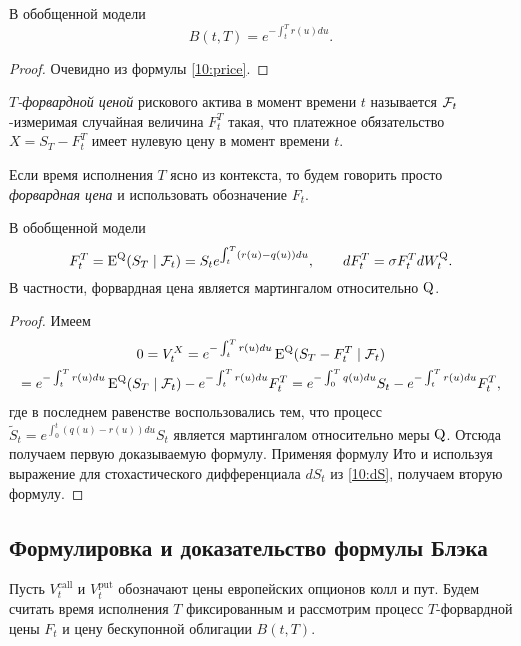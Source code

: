 \begin{proposition}
В обобщенной модели \bs
\[
B(t,T) = e^{-\int_t^T r(u) du}.
\]
\end{proposition}

\begin{proof}
Очевидно из формулы \eqref{10:price}.
\end{proof}

\begin{definition}
\emph{$T$-форвардной ценой} рискового актива в момент времени $t$ называется $\mathcal{F}_t$-измеримая случайная величина $F_t^T$ такая, что платежное обязательство $X=S_T - F_t^T$ имеет нулевую цену в момент времени $t$.

Если время исполнения $T$ ясно из контекста, то будем говорить просто \emph{форвардная цена} и использовать обозначение $F_t$.
\end{definition}

\begin{proposition}
В обобщенной модели \bs
\[
F_t^T = \operatorname{E}^{\mathrm{Q}}(S_T\mid \mathcal{F}_t) = S_t e^{\int_t^T (r(u)-q(u)) du}, \qquad
d F_t^T = \sigma F_t^T d W_t^{\mathrm{Q}}.
\]
В частности, форвардная цена является мартингалом относительно $\mathrm{Q}$.
\end{proposition}

\begin{proof}
Имеем
\begin{multline*}
0 = V_t^X = e^{-\int_t^T r(u) du} \operatorname{E}^{\mathrm{Q}}(S_T - F_t^T \mid \mathcal{F}_t) \\= e^{-\int_t^T r(u) du} \operatorname{E}^{\mathrm{Q}} (S_T\mid \mathcal{F}_t) - e^{-\int_t^T r(u) du} F_t^T
= e^{-\int_0^T q(u) du} S_t - e^{-\int_t^T r(u) du} F_t^T,
\end{multline*}
где в последнем равенстве воспользовались тем, что процесс $\tilde S_t = e^{\int_0^t (q(u)-r(u))du} S_t$ является мартингалом относительно меры $\mathrm{Q}$.
Отсюда получаем первую доказываемую формулу.
Применяя формулу Ито и используя выражение для стохастического дифференциала $d S_t$ из \eqref{10:dS}, получаем вторую формулу.
\end{proof}

\subsection{Формулировка и доказательство формулы Блэка}

Пусть $V_t^\text{call}$ и $V_t^\text{put}$ обозначают цены европейских опционов колл и пут.
Будем считать время исполнения $T$ фиксированным и рассмотрим процесс $T$-форвардной цены $F_t$ и цену бескупонной облигации $B(t,T)$. 

